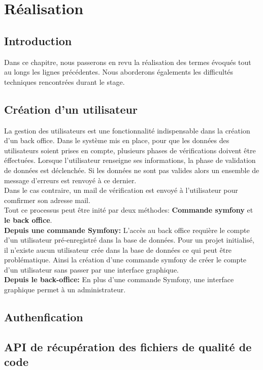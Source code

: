 \chapter{Réalisation}
	\section{Introduction}
		Dans ce chapitre, nous passerons en revu la réalisation des termes évoqués tout au longs les lignes précédentes. Nous aborderons égalements les difficultés techniques rencontrées durant le stage.
	\section{Création d'un utilisateur}
	La gestion des utilisateurs est une fonctionnalité indispensable dans la création d'un back office. Dans le système mis en place, pour que les données des utilisateurs soient prises en compte, plusieurs phases de vérifications doivent être éffectuées. Lorsque l'utilisateur renseigne ses informations, la phase de validation de données est déclenchée. Si les données ne sont pas valides alors un ensemble de message d'erreurs est renvoyé à ce dernier.\\
	Dans le cas contraire, un mail de vérification est envoyé à l'utilisateur pour comfirmer son adresse mail.\\
	Tout ce processus peut être inité par deux méthodes: \textbf{Commande symfony} et \textbf{le back office}.\\
	
		\textbf{Depuis une commande Symfony: } L'accès au back office requière le compte d'un utilisateur pré-enregistré dans la base de données.
			Pour un projet initialisé, il n'existe aucun utilisateur crée dans la base de données ce qui peut être problématique. Ainsi la création d'une commande symfony de créer le compte d'un utilisateur sans passer par une interface graphique.\\
			
		\textbf{Depuis le back-office: } En plus d'une commande Symfony, une interface graphique permet à un administrateur.
	\section{Authenfication}
		
	\section{API de récupération des fichiers de qualité de code}
